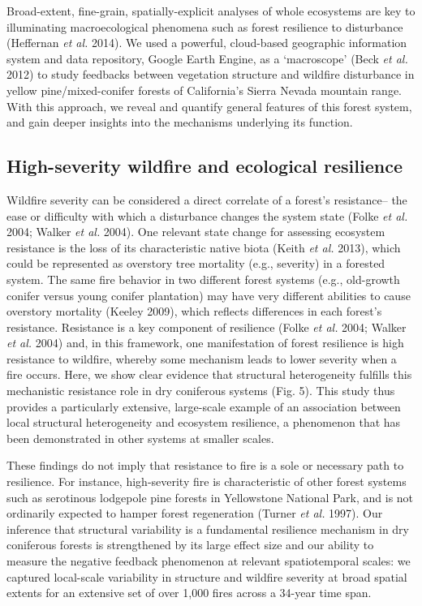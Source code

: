 \documentclass[]{article}
\begin{document}
Broad-extent, fine-grain, spatially-explicit analyses of whole
ecosystems are key to illuminating macroecological phenomena such as
forest resilience to disturbance (Heffernan \emph{et al.} 2014). We used
a powerful, cloud-based geographic information system and data
repository, Google Earth Engine, as a `macroscope' (Beck \emph{et al.}
2012) to study feedbacks between vegetation structure and wildfire
disturbance in yellow pine/mixed-conifer forests of California's Sierra
Nevada mountain range. With this approach, we reveal and quantify
general features of this forest system, and gain deeper insights into
the mechanisms underlying its function.

\hypertarget{high-severity-wildfire-and-ecological-resilience}{%
\subsection{High-severity wildfire and ecological
resilience}\label{high-severity-wildfire-and-ecological-resilience}}

Wildfire severity can be considered a direct correlate of a forest's
resistance-- the ease or difficulty with which a disturbance changes the
system state (Folke \emph{et al.} 2004; Walker \emph{et al.} 2004). One
relevant state change for assessing ecosystem resistance is the loss of
its characteristic native biota (Keith \emph{et al.} 2013), which could
be represented as overstory tree mortality (e.g., severity) in a
forested system. The same fire behavior in two different forest systems
(e.g., old-growth conifer versus young conifer plantation) may have very
different abilities to cause overstory mortality (Keeley 2009), which
reflects differences in each forest's resistance. Resistance is a key
component of resilience (Folke \emph{et al.} 2004; Walker \emph{et al.}
2004) and, in this framework, one manifestation of forest resilience is
high resistance to wildfire, whereby some mechanism leads to lower
severity when a fire occurs. Here, we show clear evidence that
structural heterogeneity fulfills this mechanistic resistance role in
dry coniferous systems (Fig. 5). This study thus provides a particularly
extensive, large-scale example of an association between local
structural heterogeneity and ecosystem resilience, a phenomenon that has
been demonstrated in other systems at smaller scales.

These findings do not imply that resistance to fire is a sole or
necessary path to resilience. For instance, high-severity fire is
characteristic of other forest systems such as serotinous lodgepole pine
forests in Yellowstone National Park, and is not ordinarily expected to
hamper forest regeneration (Turner \emph{et al.} 1997). Our inference
that structural variability is a fundamental resilience mechanism in dry
coniferous forests is strengthened by its large effect size and our
ability to measure the negative feedback phenomenon at relevant
spatiotemporal scales: we captured local-scale variability in structure
and wildfire severity at broad spatial extents for an extensive set of
over 1,000 fires across a 34-year time span.
\end{document}
